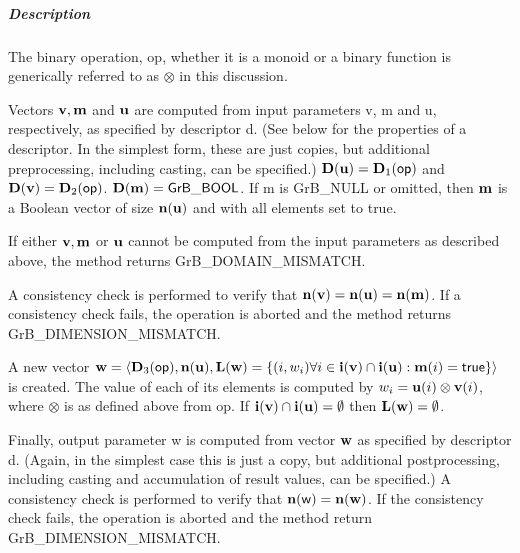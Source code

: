 \subparagraph{Description}


The binary operation, {\sf op}, whether it is a monoid or a binary function
is generically referred to as $\otimes$ in this discussion.

Vectors ${\bf v}, {\bf m}$ and ${\bf u}$ are computed from
input parameters {\sf v}, {\sf m} and {\sf u}, respectively, as specified
by descriptor {\sf d}. (See below for the properties of a descriptor. In
the simplest form, these are just copies, but additional preprocessing,
including casting, can be specified.)  $\bold{D}({\bf u}) =
\bold{D}_1({\sf op})$ and $\bold{D}({\bf v}) = \bold{D}_2({\sf op})$.
$\bold{D}({\bf m}) = {\sf GrB\_BOOL}$.  If {\sf m} is {\sf GrB\_NULL} or omitted,
then ${\bf m}$ is a Boolean vector of size $\bold{n}({\bf u})$
and with all elements set to {\sf true}.

If either ${\bf v}, {\bf m}$ or ${\bf u}$ cannot be computed
from the input parameters as described above, the method returns {\sf
GrB\_DOMAIN\_MISMATCH}.

A consistency check is performed to verify that $\bold{n}({\bf v})
= \bold{n}({\bf u}) = \bold{n}({\bf m})$. If a consistency
check fails, the operation is aborted and the method returns {\sf
GrB\_DIMENSION\_MISMATCH}.

A new vector ${\bf w} = \langle \bold{D}_3({\sf op}),
\bold{n}({\bf u}), \bold{L}({\bf w}) = \{(i,w_i)  \forall i \in
{\bf i}({\bf v}) \cap {\bf i}({\bf u}) : {\bf m}(i)
= {\sf true} \} \rangle$ is created.  The value of each of its
elements is computed by $w_i = {\bf u}(i) \otimes {\bf v}(i)$,
where $\otimes$ is as defined above from {\sf op}.
If ${\bf i}({\bf v}) \cap {\bf i}({\bf u}) = \emptyset$
then $\bold{L}({\bf w}) = \emptyset$.

Finally, output parameter {\sf w} is computed from vector ${\bf w}$
as specified by descriptor {\sf d}. (Again, in the simplest case this
is just a copy, but additional postprocessing, including casting and
accumulation of result values, can be specified.)  A consistency check is
performed to verify that $\bold{n}({\sf w}) = \bold{n}({\bf w})$. If
the consistency check fails, the operation is aborted and the method
return {\sf GrB\_DIMENSION\_MISMATCH}.


